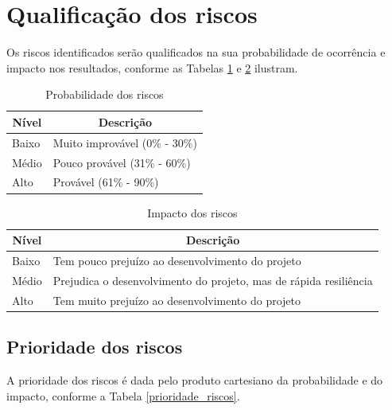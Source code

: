 \vfill
\pagebreak

\section*{Qualificação dos riscos}
Os riscos identificados serão qualificados na sua probabilidade de ocorrência e impacto nos resultados, conforme as Tabelas \ref{probabilidade_riscos} e \ref{impacto_riscos} ilustram.

\begin{table}[h]
\centering
\caption{Probabilidade dos riscos}
\label{probabilidade_riscos}
\begin{tabular}{|l|l|}
\hline
\multicolumn{1}{|c|}{\textbf{Nível}} & \multicolumn{1}{c|}{\textbf{Descrição}} \\ \hline
Baixo                                & Muito improvável (0\% - 30\%)       \\ \hline
Médio                                & Pouco provável (31\% - 60\%)            \\ \hline
Alto                                 & Provável (61\% - 90\%)                  \\ \hline
\end{tabular}
\end{table}


\begin{table}[h]
\centering
\caption{Impacto dos riscos}
\label{impacto_riscos}
\begin{tabular}{|l|l|}
\hline
\multicolumn{1}{|c|}{\textbf{Nível}} & \multicolumn{1}{c|}{\textbf{Descrição}} \\ \hline
Baixo & Tem pouco prejuízo ao desenvolvimento do projeto \\ \hline
Médio & Prejudica o desenvolvimento do projeto, mas de rápida resiliência \\ \hline
Alto & Tem muito prejuízo ao desenvolvimento do projeto \\ \hline
\end{tabular}
\end{table}

\subsection*{Prioridade dos riscos}

A prioridade dos riscos é dada pelo produto cartesiano da probabilidade e do impacto, conforme a Tabela \ref{prioridade_riscos}.


